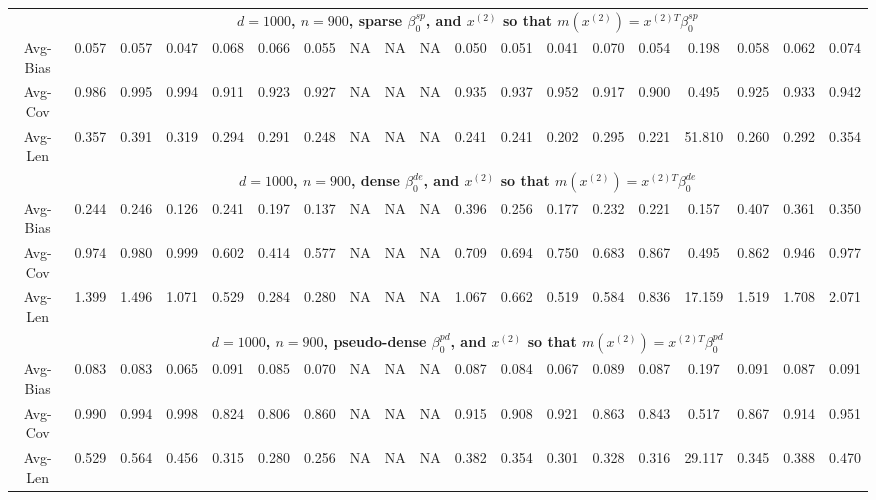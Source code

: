 \documentclass[ejsv2,noshowframe]{imsart}
\theoremstyle{plain}
\theoremstyle{definition}
\theoremstyle{remark}
\begin{document}
\begin{table}[hbtp!]
\begin{center}
{\begin{tabular}{ccccccccccccccccccc}
			& \multicolumn{18}{c}{\bf $d=1000$, $n = 900$, sparse $\beta_0^{sp}$, and $x^{(2)}$ so that $m(x^{(2)})=x^{(2)T}\beta_0^{sp}$} \\ \cline{2-19}
			Avg-Bias & 0.057 & 0.057 & 0.047 & 0.068 & 0.066 & 0.055 & NA & NA & NA & 0.050 & 0.051 & 0.041 & 0.070 & 0.054 & 0.198 & 0.058 & 0.062 & 0.074 \\
			Avg-Cov & 0.986 & 0.995 & 0.994 & 0.911 & 0.923 & 0.927 & NA & NA & NA & 0.935 & 0.937 & 0.952 & 0.917 & 0.900 & 0.495 & 0.925 & 0.933 & 0.942 \\
			Avg-Len & 0.357 & 0.391 & 0.319 & 0.294 & 0.291 & 0.248 & NA & NA & NA & 0.241 & 0.241 & 0.202 & 0.295 & 0.221 & 51.810 & 0.260 & 0.292 & 0.354 \\
			\cline{2-19}
			& \multicolumn{18}{c}{\bf $d=1000$, $n = 900$, dense $\beta_0^{de}$, and $x^{(2)}$ so that $m(x^{(2)})=x^{(2)T}\beta_0^{de}$} \\ \cline{2-19}
			Avg-Bias & 0.244 & 0.246 & 0.126 & 0.241 & 0.197 & 0.137 & NA & NA & NA & 0.396 & 0.256 & 0.177 & 0.232 & 0.221 & 0.157 & 0.407 & 0.361 & 0.350 \\
			Avg-Cov & 0.974 & 0.980 & 0.999 & 0.602 & 0.414 & 0.577 & NA & NA & NA & 0.709 & 0.694 & 0.750 & 0.683 & 0.867 & 0.495 & 0.862 & 0.946 & 0.977 \\
			Avg-Len & 1.399 & 1.496 & 1.071 & 0.529 & 0.284 & 0.280 & NA & NA & NA & 1.067 & 0.662 & 0.519 & 0.584 & 0.836 & 17.159 & 1.519 & 1.708 & 2.071 \\
			\cline{2-19}
			& \multicolumn{18}{c}{\bf $d=1000$, $n = 900$, pseudo-dense $\beta_0^{pd}$, and $x^{(2)}$ so that $m(x^{(2)})=x^{(2)T}\beta_0^{pd}$} \\ \cline{2-19}
			Avg-Bias & 0.083 & 0.083 & 0.065 & 0.091 & 0.085 & 0.070 & NA & NA & NA & 0.087 & 0.084 & 0.067 & 0.089 & 0.087 & 0.197 & 0.091 & 0.087 & 0.091 \\
			Avg-Cov & 0.990 & 0.994 & 0.998 & 0.824 & 0.806 & 0.860 & NA & NA & NA & 0.915 & 0.908 & 0.921 & 0.863 & 0.843 & 0.517 & 0.867 & 0.914 & 0.951 \\
			Avg-Len & 0.529 & 0.564 & 0.456 & 0.315 & 0.280 & 0.256 & NA & NA & NA & 0.382 & 0.354 & 0.301 & 0.328 & 0.316 & 29.117 & 0.345 & 0.388 & 0.470 \\
			\hline
			

\end{tabular}}
\end{center}
\end{table}
\end{document}
